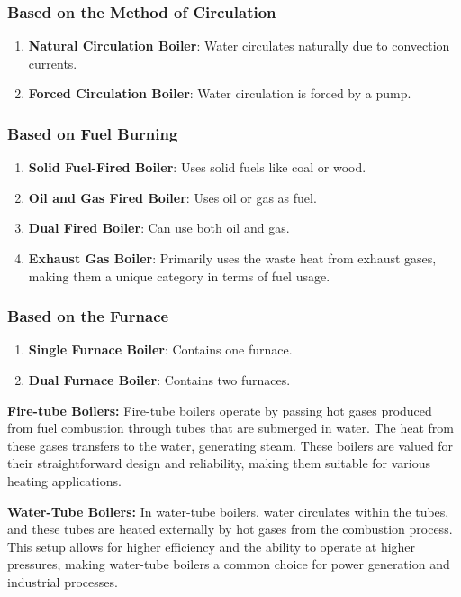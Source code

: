 \subsubsection{Based on the Method of Circulation}
\begin{enumerate}
    \item \textbf{Natural Circulation Boiler}: Water circulates naturally due to convection currents.
    \item \textbf{Forced Circulation Boiler}: Water circulation is forced by a pump.
\end{enumerate}

\subsubsection{Based on Fuel Burning}
\begin{enumerate}
    \item \textbf{Solid Fuel-Fired Boiler}: Uses solid fuels like coal or wood.
    \item \textbf{Oil and Gas Fired Boiler}: Uses oil or gas as fuel.
    \item \textbf{Dual Fired Boiler}: Can use both oil and gas.
    \item \textbf{Exhaust Gas Boiler}: Primarily uses the waste heat from exhaust gases, making them a unique category in terms of fuel usage.
\end{enumerate}

\subsubsection{Based on the Furnace}
\begin{enumerate}
    \item \textbf{Single Furnace Boiler}: Contains one furnace.
    \item \textbf{Dual Furnace Boiler}: Contains two furnaces.
\end{enumerate}


\textbf{Fire-tube Boilers:}
Fire-tube boilers operate by passing hot gases produced from fuel combustion through tubes that are submerged in water. The heat from these gases transfers to the water, generating steam. These boilers are valued for their straightforward design and reliability, making them suitable for various heating applications.

\textbf{Water-Tube Boilers:}
In water-tube boilers, water circulates within the tubes, and these tubes are heated externally by hot gases from the combustion process. This setup allows for higher efficiency and the ability to operate at higher pressures, making water-tube boilers a common choice for power generation and industrial processes.

